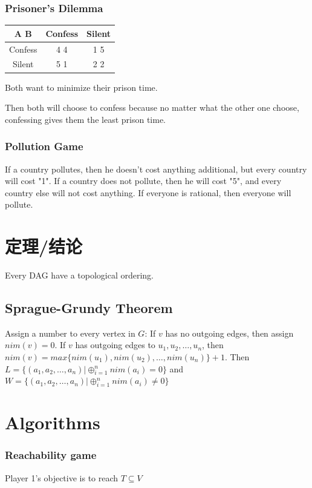 \documentclass[12pt,a4paper]{ctexrep}
\begin{document}
\subsubsection{Prisoner's Dilemma}
\begin{center}
\begin{tabular}{|c|c|c|}
\hline
A  B & Confess & Silent\\
\hline
Confess & 4 4 & 1 5 \\
\hline
Silent & 5 1 & 2 2 \\
\hline

\end{tabular}
Both want to minimize their prison time.
\end{center}
Then both will choose to confess because no matter what the other one choose, confessing gives them the least prison time.

\subsubsection{Pollution Game}
If a country pollutes, then he doesn't cost anything additional, but every country will cost "1". If a country does not pollute, then he will cost "5", and every country else will not cost anything. If everyone is rational, then everyone will pollute.

\section{定理/结论}
Every DAG have a topological ordering.

\subsection{Sprague-Grundy Theorem}
Assign a number to every vertex in $G$: If $v$ has no outgoing edges, then assign $nim(v) = 0$. If $v$ has outgoing edges to $u_1,u_2,\dots,u_n$, then $nim(v) = max\{nim(u_1),nim(u_2),\dots, nim(u_n)\}+1$. Then $L = \{(a_1,a_2,\dots,a_n)|\oplus_{i=1}^n nim(a_i) = 0\}$ and $W = \{(a_1,a_2,\dots,a_n)|\oplus_{i=1}^n nim(a_i) \neq 0\}$

\section{Algorithms}
\subsubsection{Reachability game}
Player 1's objective is to reach $T \subseteq V$
\end{document}
